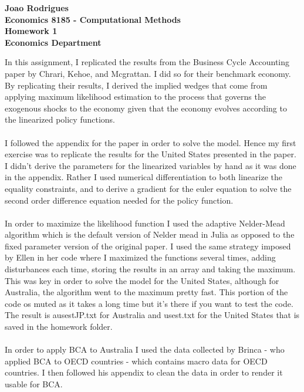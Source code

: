 \documentclass{article} %
\begin{document}
\begin{center}
  \textbf{Joao Rodrigues} \\
  \textbf{Economics 8185 - Computational Methods} \\
  \textbf{Homework 1} \\
  \textbf{Economics Department}
\end{center}
In this assignment, I replicated the results from the Business Cycle Accounting paper by Chrari, Kehoe, and Mcgrattan. I did so for their benchmark economy. By replicating their results, I derived the implied wedges that come from applying maximum likelihood estimation to the process that governs the exogenous shocks to the economy given that the economy evolves according to the linearized policy functions.
\\
\\
I followed the appendix for the paper in order to solve the model. Hence my first exercise was to replicate the results for the United States presented in the paper. I didn't derive the parameters for the linearized variables by hand as it was done in the appendix. Rather I used numerical differentiation to both linearize the equality constraints, and to derive a gradient for the euler equation to solve the second order difference equation needed for the policy function.   
\\
\\
In order to maximize the likelihood function I used the adaptive Nelder-Mead algorithm which is the default version of Nelder mead in Julia as opposed to the fixed parameter version of the original paper. I used the same strategy imposed by Ellen in her code where I maximized the functions several times, adding disturbances each time, storing the results in an array and taking the maximum. This was key in order to solve the model for the United States, although for Australia, the algorithm went to the maximum pretty fast. This portion of the code os muted as it takes a long time but it's there if you want to test the code. The result is ausestJP.txt for Australia and usest.txt for the United States that is saved in the homework folder.
\\
\\
In order to apply BCA to Australia I used the data collected by Brinca - who applied BCA to OECD countries - which contains macro data for OECD countries. I then followed his appendix to clean the data in order to render it usable for BCA. 
\end{document}
